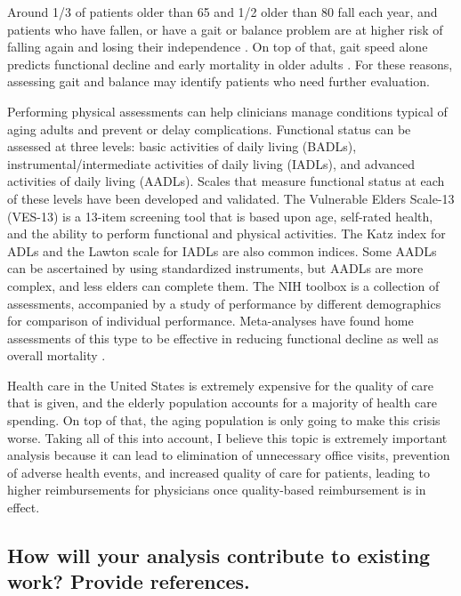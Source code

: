 \documentclass[twoside,11pt]{article}
\begin{document}
  Around 1/3 of patients older than 65 and 1/2 older than 80 fall each year, and patients who have fallen, or have a gait or balance problem are at higher risk of falling again and losing their independence \citep{cite8}. On top of that, gait speed alone predicts functional decline and early mortality in older adults \citep{cite8}. For these reasons, assessing gait and balance may identify patients who need further evaluation.

  Performing physical assessments can help clinicians manage conditions typical of aging adults and prevent or delay complications. Functional status can be assessed at three levels: basic activities of daily living (BADLs), instrumental/intermediate activities of daily living (IADLs), and advanced activities of daily living (AADLs). Scales that measure functional status at each of these levels have been developed and validated. The Vulnerable Elders Scale-13 (VES-13) is a 13-item screening tool that is based upon age, self-rated health, and the ability to perform functional and physical activities. The Katz index for ADLs and the Lawton scale for IADLs are also common indices. Some AADLs can be ascertained by using standardized instruments, but AADLs are more complex, and less elders can complete them. The NIH toolbox is a collection of assessments, accompanied by a study of performance by different demographics for comparison of individual performance. Meta-analyses have found home assessments of this type to be effective in reducing functional decline as well as overall mortality \citep{cite8}. 
  
  Health care in the United States is extremely expensive for the quality of care that is given, and the elderly population accounts for a majority of health care spending. On top of that, the aging population is only going to make this crisis worse. Taking all of this into account, I believe this topic is extremely important analysis because it can lead to elimination of unnecessary office visits, prevention of adverse health events, and increased quality of care for patients, leading to higher reimbursements for physicians once quality-based reimbursement is in effect.


\subsection{How will your analysis contribute to existing work? Provide references.}
\end{document}
